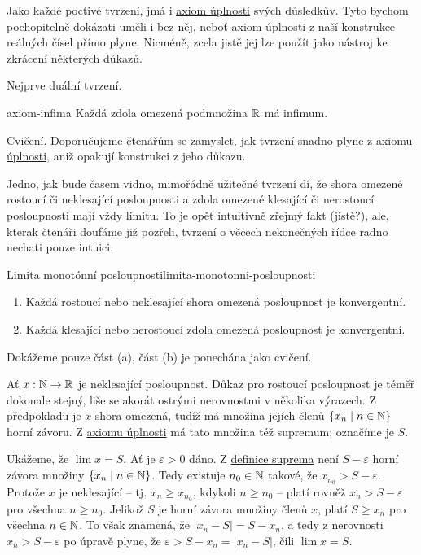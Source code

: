 Jako každé poctivé tvrzení, jmá i \hyperref[prop:axiom-uplnosti]{axiom úplnosti}
svých důsledkův. Tyto bychom pochopitelně dokázati uměli i bez něj, neboť axiom
úplnosti z naší konstrukce reálných čísel přímo plyne. Nicméně, zcela jistě jej
lze použít jako nástroj ke zkrácení některých důkazů.

Nejprve duální tvrzení.

\begin{proposition}{}{axiom-infima}
 Každá zdola omezená podmnožina $\mathbb{R}$ má infimum.
\end{proposition}
\begin{propproof}
 Cvičení. Doporučujeme čtenářům se zamyslet, jak tvrzení snadno plyne z
 \hyperref[prop:axiom-uplnosti]{axiomu úplnosti}, aniž opakují konstrukci z jeho
 důkazu.
\end{propproof}

Jedno, jak bude časem vidno, mimořádně užitečné tvrzení dí, že shora omezené
rostoucí či neklesající posloupnosti a zdola omezené klesající či nerostoucí
posloupnosti mají vždy limitu. To je opět intuitivně zřejmý fakt (jistě?), ale,
kterak čtenáři doufáme již pozřeli, tvrzení o věcech nekonečných řídce radno
nechati pouze intuici.

\begin{lemma}{Limita monotónní posloupnosti}{limita-monotonni-posloupnosti}
 \vspace*{-\parskip}
 \begin{enumerate}[label=(\alph*)]
  \item Každá rostoucí nebo neklesající shora omezená posloupnost je
   konvergentní.
  \item Každá klesající nebo nerostoucí zdola omezená posloupnost je
   konvergentní.
 \end{enumerate}
\end{lemma}
\begin{lemproof}
 Dokážeme pouze část (a), část (b) je ponechána jako cvičení.

 Ať $x:\mathbb{N} \to \mathbb{R}$ je neklesající posloupnost. Důkaz pro rostoucí posloupnost je
 téměř dokonale stejný, liše se akorát ostrými nerovnostmi v několika výrazech.
 Z předpokladu je $x$ shora omezená, tudíž má množina jejích členů $\{x_n \mid n
 \in \mathbb{N}\}$ horní závoru. Z \hyperref[prop:axiom-uplnosti]{axiomu úplnosti} má
 tato množina též supremum; označíme je $S$.

 Ukážeme, že $\lim x = S$. Ať je $\varepsilon>0$ dáno. Z
 \hyperref[def:supremum-a-infimum]{definice suprema} není $S - \varepsilon$
 horní závora množiny $\{x_n \mid n \in \mathbb{N}\}$. Tedy existuje $n_0 \in \mathbb{N}$
 takové, že $x_{n_0} > S - \varepsilon$. Protože $x$ je neklesající -- tj. $x_n
 \geq x_{n_0}$, kdykoli $n \geq n_0$ -- platí rovněž $x_n > S - \varepsilon$ pro
 všechna $n \geq n_0$. Jelikož $S$ je horní závora množiny členů $x$, platí $S
\geq x_n$ pro všechna $n \in \mathbb{N}$. To však znamená, že $|x_n - S| = S - x_n$, a
tedy z nerovnosti $x_n > S - \varepsilon$ po úpravě plyne, že $\varepsilon > S -
x_n = |x_n - S|$, čili $\lim x = S$.
\end{lemproof}

